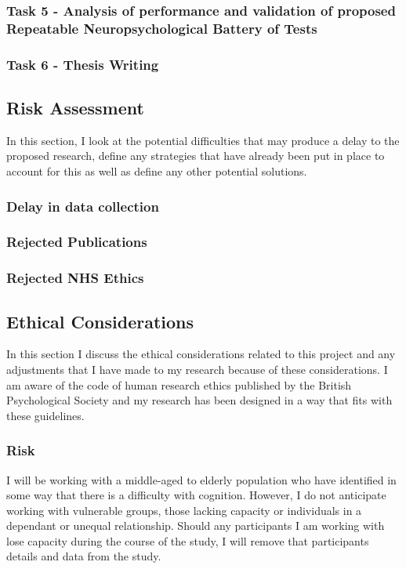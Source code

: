 \documentclass[12pt, twoside, a4paper]{article}
\begin{document}
\subsubsection{Task 5 - Analysis of performance and validation of proposed Repeatable Neuropsychological Battery of Tests}  

\subsubsection{Task 6 - Thesis Writing}

\subsection{Risk Assessment}
In this section, I look at the potential difficulties that may produce a delay to the proposed research, define any strategies that have already been put in place to account for this as well as define any other potential solutions.
\subsubsection{Delay in data collection}

\subsubsection{Rejected Publications}

\subsubsection{Rejected NHS Ethics}

\subsection{Ethical Considerations}
In this section I discuss the ethical considerations related to this project and any adjustments that I have made to my research because of these considerations. I am aware of the code of human  research ethics published by the British Psychological Society \cite{Society2012} and my research has been designed in a way that fits with these guidelines.
\subsubsection{Risk}
I will be working with a middle-aged to elderly population who have identified in some way that there is a difficulty with cognition. However, I do not anticipate working with vulnerable groups, those lacking capacity or individuals in a dependant or unequal relationship. Should any participants I am working with lose capacity during the course of the study, I will remove that participants details and data from the study.
\par
\end{document}
